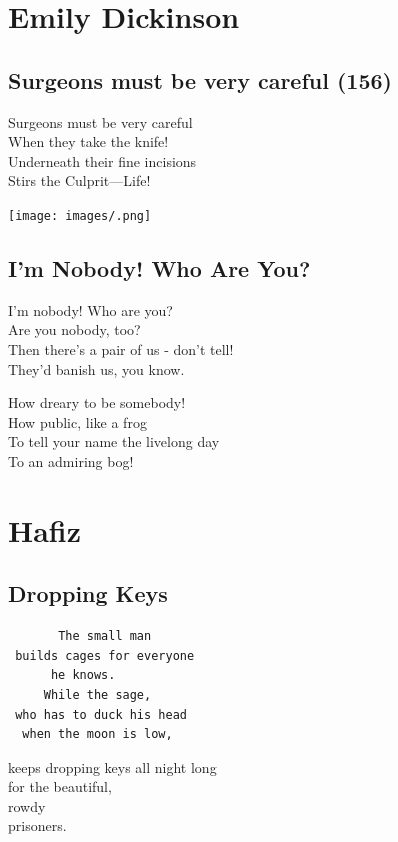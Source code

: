 \documentclass[
]{book}
\renewenvironment{quote}{\begin{VF}}{\end{VF}}
\begin{document}
\hypertarget{emily-dickinson}{%
\chapter{Emily Dickinson}\label{emily-dickinson}}

\hypertarget{surgeons-must-be-very-careful-156}{%
\section{Surgeons must be very careful (156)}\label{surgeons-must-be-very-careful-156}}

\begin{quote}
Surgeons must be very careful\\
When they take the knife!\\
Underneath their fine incisions\\
Stirs the Culprit---Life!
\end{quote}

\texttt{[image: images/.png]}

\hypertarget{im-nobody-who-are-you}{%
\section{I'm Nobody! Who Are You?}\label{im-nobody-who-are-you}}

\begin{quote}
I'm nobody! Who are you?\\
Are you nobody, too?\\
Then there's a pair of us - don't tell!\\
They'd banish us, you know.

How dreary to be somebody!\\
How public, like a frog\\
To tell your name the livelong day\\
To an admiring bog!
\end{quote}

\hypertarget{hafiz}{%
\chapter{Hafiz}\label{hafiz}}

\hypertarget{dropping-keys}{%
\section{Dropping Keys}\label{dropping-keys}}

\begin{quote}
\begin{verbatim}
       The small man    
 builds cages for everyone    
      he knows.    
     While the sage,  
 who has to duck his head    
  when the moon is low,  
\end{verbatim}

keeps dropping keys all night long\\
for the beautiful,\\
rowdy\\
prisoners.
\end{quote}
\end{document}
